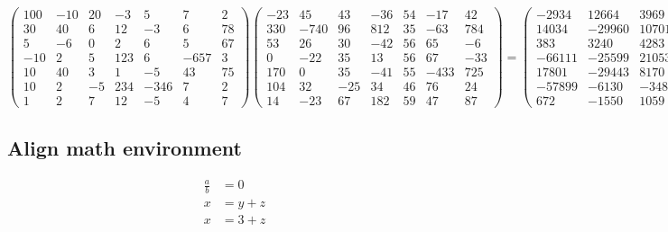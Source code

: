 \documentclass{article}%
\begin{document}
\[%
\begin{pmatrix}%
100&-10&20&-3&5&7&2\\%
30&40&6&12&-3&6&78\\%
5&-6&0&2&6&5&67\\%
-10&2&5&123&6&-657&3\\%
10&40&3&1&-5&43&75\\%
10&2&-5&234&-346&7&2\\%
1&2&7&12&-5&4&7%
\end{pmatrix} \begin{pmatrix}%
-23&45&43&-36&54&-17&42\\%
330&-740&96&812&35&-63&784\\%
53&26&30&-42&56&65&-6\\%
0&-22&35&13&56&67&-33\\%
170&0&35&-41&55&-433&725\\%
104&32&-25&34&46&76&24\\%
14&-23&67&182&59&47&87%
\end{pmatrix} = \begin{pmatrix}%
-2934&12664&3969&-12202&6717&-1510&306\\%
14034&-29960&10701&45827&8741&3585&36943\\%
383&3240&4283&7092&4685&1358&5739\\%
-66111&-25599&21053&-18665&-23017&-43779&-14098\\%
17801&-29443&8170&47324&8292&6530&35661\\%
-57899&-6130&-3489&19304&-5156&165501&-256212\\%
672&-1550&1059&3065&1510&3914&-1748%
\end{pmatrix}%
\]

%
\subsection{Align math environment}%
\label{subsec:Alignmathenvironment}%
\begin{align}%
\frac{a}{b} &= 0 \\%
x &= y + z \\%
x &= 3 + z%
\end{align}
\end{document}
